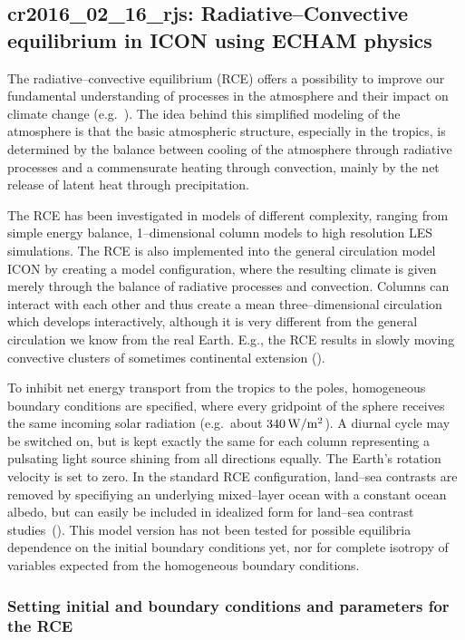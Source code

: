 \subsection[cr2016\_06\_14\_rjs: RCE in ICON using ECHAM physics]{cr2016\_02\_16\_rjs:
  Radiative--Convective equilibrium in ICON using ECHAM physics}\label{cr20160614rjs}

The radiative--convective equilibrium (RCE) offers a possibility
to improve our fundamental understanding of processes in the
atmosphere and their impact on climate change
(e.g.~\cite{man641}). The idea behind this simplified modeling
of the atmosphere 
is that the basic 
atmospheric structure, especially in the tropics, is determined by the
balance between cooling of the atmosphere through radiative processes
and a commensurate heating through convection, mainly by the net
release of latent heat through precipitation. 

The RCE has been investigated in models of different complexity,
ranging from simple energy balance, 1--dimensional column models to
high resolution LES simulations. The RCE is also implemented into the 
general circulation model ICON by creating a model configuration,
where the resulting climate is given merely through the balance of
radiative processes and convection. Columns can interact with each
other and thus create a mean three--dimensional circulation which
develops interactively, although it is very different from the general
circulation we know from the real Earth. E.g., the RCE results in slowly moving
convective clusters of sometimes continental extension (\cite{pop131}).  

To inhibit net energy transport from the tropics to the poles,
homogeneous boundary conditions are specified, where every gridpoint
of the sphere receives the same incoming solar radiation
(e.g.~about $340\,{\rm W/m^2}$). A diurnal
cycle may be switched on, but is kept exactly the same for each column
representing a pulsating light source shining from all directions
equally. The Earth's rotation velocity is set to zero. In the standard
RCE configuration, land--sea contrasts are removed by specifiying an
underlying mixed--layer ocean with a constant ocean albedo, but can
easily be included in idealized form for land--sea contrast
studies~(\cite{bec14x}). 
This model version has not been tested
for possible equilibria dependence on the initial boundary conditions
yet, nor for complete isotropy of variables expected from the
homogeneous boundary conditions. 

\subsubsection{Setting initial and boundary conditions and parameters
  for the RCE}

